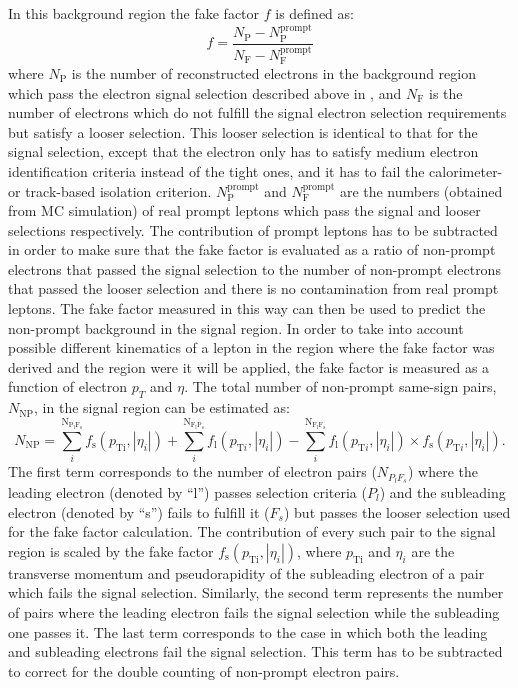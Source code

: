 In this background region the fake factor $f$ is defined as:
\begin{equation}
f = \frac{N_{\mathrm{P}} - N_{\mathrm{P}}^{\mathrm{prompt}}}{N_{\mathrm{F}}  - N_{\mathrm{F}}^{\mathrm{prompt}}}
\label{eq:fakefactor}
\end{equation}
where $N_{\mathrm{P}}$ is the number of reconstructed electrons in the background region which pass the electron signal selection
described above in , and $N_{\mathrm{F}}$ is the number of electrons which do not fulfill the 
signal electron selection requirements but satisfy a looser selection. This looser selection is identical to that for the signal selection, except 
that the electron only has to satisfy medium electron identification criteria instead of the tight ones,
and it has to fail the calorimeter- or track-based isolation criterion.
$N_{\mathrm{P}}^{\mathrm{prompt}}$ and $N_{\mathrm{F}}^{\mathrm{prompt}}$ are the numbers (obtained from MC simulation) of real prompt
leptons which pass the signal and looser selections respectively.
The contribution of prompt leptons has to be subtracted in order to make sure that 
the fake factor is evaluated as a ratio of non-prompt electrons that passed the signal selection to
the number of non-prompt electrons that passed the looser selection and there is no contamination from real prompt leptons.
The fake factor measured in this way can then be used to predict the non-prompt background in the signal region.
In order to take into account possible different kinematics of a lepton in the region where the fake factor was derived 
and the region were it will be applied, the fake factor is measured as a function of electron $p_T$ and $\eta$.
The total number of non-prompt same-sign pairs, $N_{\mathrm{NP}}$, in the signal region can be estimated as:
\begin{equation}
N_{\mathrm{NP}} = \sum_{i}^{\mathrm{N_{P_l F_s}}} f_{\mathrm{s}}(p_{\mathrm{Ti}},|\eta_{i}|) + \sum_{i}^{\mathrm{N_{F_l P_s}}} f_{\mathrm{l}}(p_{\mathrm{T}i},|\eta_{i}|) - \sum_{i}^{\mathrm{N_{F_l F_s}}} f_{\mathrm{l}}(p_{\mathrm{T}i},|\eta_{i}|) \times f_{\mathrm{s}}(p_{\mathrm{T}i},|\eta_{i}|)
\label{eq:fake_pred}.
\end{equation}
The first term corresponds to the number of electron pairs ($N_{P_l F_s}$) 
where the leading electron (denoted by ``l'') passes selection criteria ($P_l$) and the subleading electron (denoted by ``s'')
fails to fulfill it ($F_s$) but passes the looser selection used for the fake factor calculation. 
The contribution of every such pair to the signal region is scaled by the fake factor 
$f_{\mathrm{s}}(p_{\mathrm{Ti}},|\eta_{i}|)$, where $p_\mathrm{Ti}$ and $\eta_{i}$ are the transverse momentum and pseudorapidity
of the subleading electron of a pair which fails the signal selection. 
Similarly, the second term represents the number of pairs where
the leading electron fails the signal selection while the subleading one passes it. 
The last term corresponds to the case in which both the leading
and subleading electrons fail the signal selection. This term has to be subtracted to correct for the double
counting of non-prompt electron pairs.

